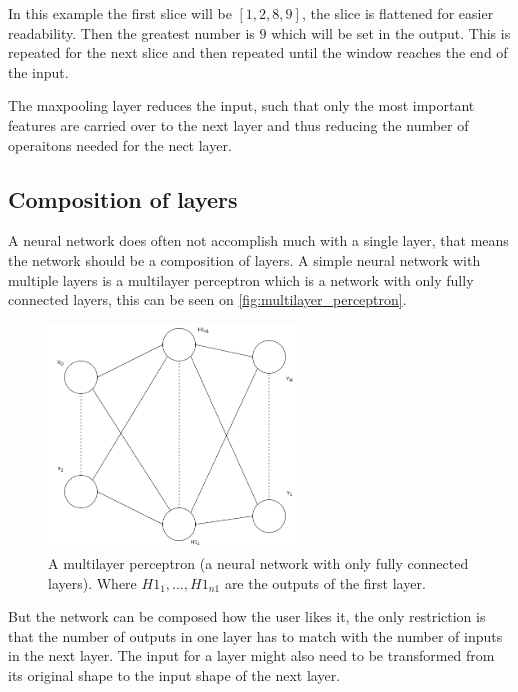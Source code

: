 In this example the first slice will be $[1, 2, 8, 9]$, the slice is flattened for easier readability. Then the greatest number is $9$ which will be set in the output. This is repeated for the next slice and then repeated until the window reaches the end of the input.

The maxpooling layer reduces the input, such that only the most important features are carried over to the next layer and thus reducing the number of operaitons needed for the nect layer.

\subsection{Composition of layers}%
\label{sub:Composition}

A neural network does often not accomplish much with a single layer, that means the network should be a composition of layers. A simple neural network with multiple layers is a multilayer perceptron which is a network with only fully connected layers, this can be seen on \autoref{fig:multilayer_perceptron}.

\begin{figure}
    \centering
    \includegraphics[width=0.6\textwidth]{assets/multilayer-perceptron.png}
    \caption{A multilayer perceptron (a neural network with only fully connected layers). Where $H1_1, ..., H1_{n1}$ are the outputs of the first layer.}
    \label{fig:multilayer_perceptron}
\end{figure}

But the network can be composed how the user likes it, the only restriction is that the number of outputs in one layer has to match with the number of inputs in the next layer. The input for a layer might also need to be transformed from its original shape to the input shape of the next layer.

